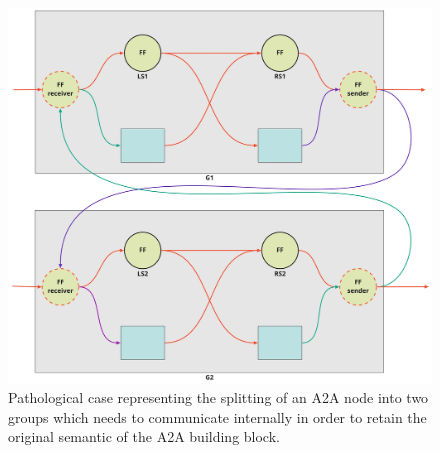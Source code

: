 \begin{figure}[H]
    \centering
    \includegraphics[width=0.8\linewidth]{res/taxonomy.jpg}
    \caption{Pathological case representing the splitting of an A2A node into two groups which needs to communicate internally in order to retain the original semantic of the A2A building block.}
    \label{fig:taxonomy}
\end{figure}